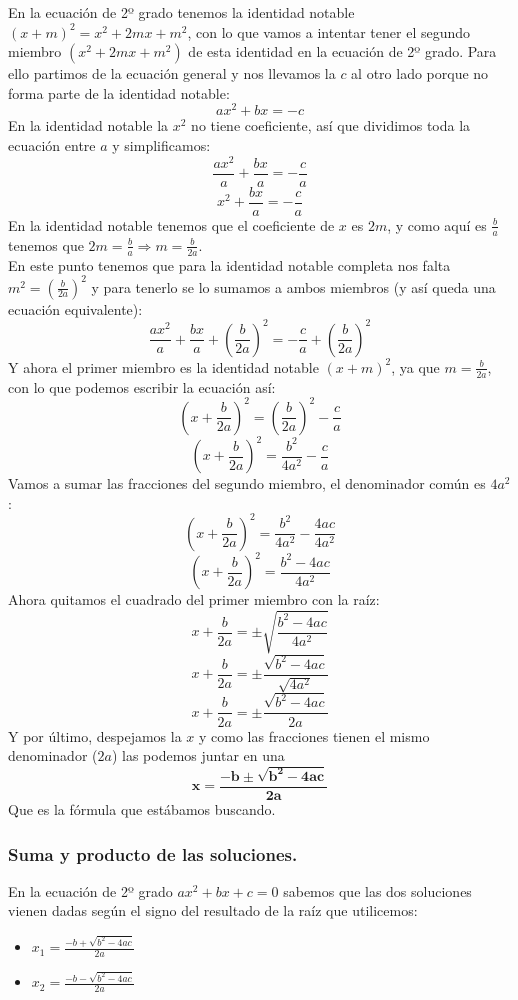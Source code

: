 \documentclass[a4paper,11pt,answers]{exam}
\begin{document}
En la ecuación de 2º grado tenemos la identidad notable $(x+m)^2 = x^2 + 2mx + m^2$, con lo que vamos a intentar tener el segundo miembro $(x^2 + 2mx + m^2)$ de esta identidad en la ecuación de 2º grado. Para ello partimos de la ecuación general y nos llevamos la $c$ al otro lado porque no forma parte de la identidad notable:
\[ax^2 + bx = -c\]
En la identidad notable la $x^2$ no tiene coeficiente, así que dividimos toda la ecuación entre $a$ y simplificamos:
\[\frac{ax^2}{a} + \frac{bx}{a} = -\frac{c}{a}\]
\[x^2 + \frac{bx}{a} = -\frac{c}{a}\]
En la identidad notable tenemos que el coeficiente de $x$ es $2m$, y como aquí es $\frac{b}{a}$ tenemos que $2m = \frac{b}{a} \Rightarrow m = \frac{b}{2a}$.\\
En este punto tenemos que para la identidad notable completa nos falta $m^2 = \left(\frac{b}{2a}
\right)^2$ y para tenerlo se lo sumamos a ambos miembros (y así queda una ecuación equivalente):
\[\frac{ax^2}{a} + \frac{bx}{a} + \left(\frac{b}{2a}\right)^2 =
  -\frac{c}{a} + \left(\frac{b}{2a}\right)^2\]
Y ahora el primer miembro es la identidad notable $(x+m)^2$, ya que $m = \frac{b}{2a}$, con lo que podemos escribir la ecuación así:
\[\left(x + \frac{b}{2a}\right)^2 = \left(\frac{b}{2a}
  \right)^2  -\frac{c}{a}\]
\[\left(x + \frac{b}{2a}\right)^2 = \frac{b^2}{4a^2}-\frac{c}{a}\]
Vamos a sumar las fracciones del segundo miembro, el denominador común es $4a^2$:
\[\left(x + \frac{b}{2a}\right)^2 = \frac{b^2}{4a^2}-\frac{4ac}{4a^2}\]
\[\left(x + \frac{b}{2a}\right)^2 = \frac{b^2-4ac}{4a^2}\]
Ahora quitamos el cuadrado del primer miembro con la raíz:
\[x + \frac{b}{2a} =\pm \sqrt{\frac{b^2-4ac}{4a^2}}\]
\[x + \frac{b}{2a} =\pm \frac{\sqrt{b^2-4ac}}{\sqrt{4a^2}}\]
\[x + \frac{b}{2a} =\pm \frac{\sqrt{b^2-4ac}}{2a}\]
Y por último, despejamos la $x$ y como las fracciones tienen el mismo denominador ($2a$) las podemos juntar en una
\[\boldsymbol{x = \frac{-b \pm \sqrt{b^2 - 4ac}}{2a}}\]
Que es la fórmula que estábamos buscando.

\subsubsection{Suma y producto de las soluciones.}
En la ecuación de 2º grado $ax^2 + bx + c = 0$ sabemos que las dos soluciones vienen dadas según
el signo del resultado de la raíz que utilicemos:
\begin{itemize}
\item $x_1 = \frac{-b+\sqrt{b^2 - 4ac}}{2a}$
\item $x_2 = \frac{-b-\sqrt{b^2 - 4ac}}{2a}$
\end{itemize}
\end{document}
